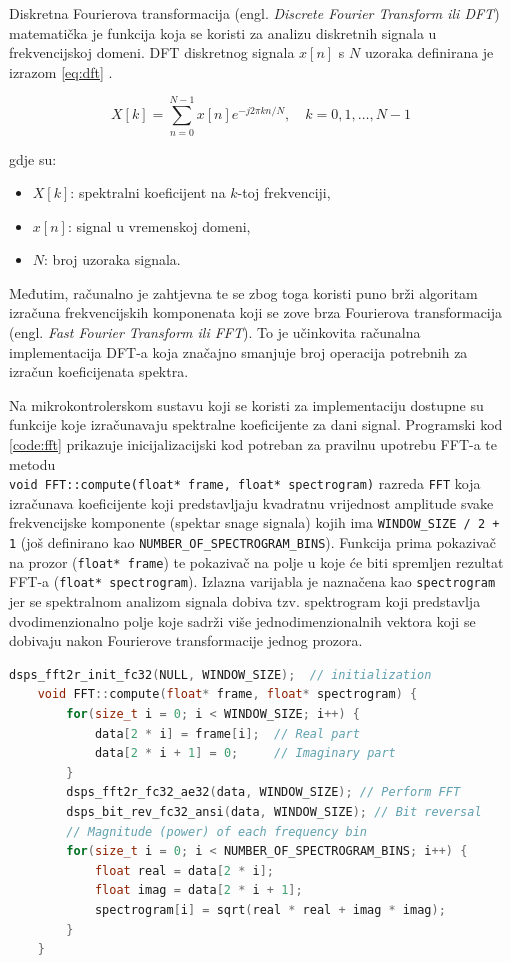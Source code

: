 Diskretna Fourierova transformacija (engl. \textit{Discrete Fourier Transform ili DFT}) matematička je
funkcija koja se koristi za analizu diskretnih signala u frekvencijskoj domeni. 
DFT diskretnog signala \( x[n] \) s \( N \) uzoraka definirana je izrazom \eqref{eq:dft} .

\begin{equation}
    X[k] = \sum_{n=0}^{N-1} x[n] e^{-j 2 \pi k n / N}, \quad k = 0, 1, \dots, N-1
    \label{eq:dft}
\end{equation}

gdje su:
\begin{itemize}
    \item \( X[k] \): spektralni koeficijent na \( k \)-toj frekvenciji,
    \item \( x[n] \): signal u vremenskoj domeni,
    \item \( N \): broj uzoraka signala.
\end{itemize}

Međutim, računalno je zahtjevna te se zbog toga koristi puno brži algoritam izračuna
frekvencijskih komponenata koji se zove brza Fourierova transformacija (engl. \textit{Fast Fourier
Transform ili FFT}). To je učinkovita računalna implementacija DFT-a koja značajno smanjuje
broj operacija potrebnih za izračun koeficijenata spektra.

Na mikrokontrolerskom sustavu koji se koristi za implementaciju dostupne su funkcije koje
izračunavaju spektralne koeficijente za dani signal. 
Programski kod \ref{code:fft} prikazuje inicijalizacijski kod potreban za pravilnu 
upotrebu FFT-a te metodu \\ \texttt{void FFT::compute(float* frame, float* spectrogram)} 
razreda \texttt{FFT} koja izračunava koeficijente koji predstavljaju kvadratnu vrijednost
amplitude svake frekvencijske komponente (spektar snage signala) kojih ima 
\texttt{WINDOW\_SIZE / 2 + 1} (još definirano kao \texttt{NUMBER\_OF\_SPECTROGRAM\_BINS}). 
Funkcija prima pokazivač na prozor (\texttt{float* frame}) te pokazivač na polje
u koje će biti spremljen rezultat FFT-a (\texttt{float* spectrogram}). Izlazna
varijabla je naznačena kao \texttt{spectrogram} jer se spektralnom analizom signala dobiva tzv.
spektrogram koji predstavlja dvodimenzionalno
polje koje sadrži više jednodimenzionalnih vektora koji se dobivaju nakon
Fourierove transformacije jednog prozora. 

\begin{lstlisting}[language=C++, caption=FFT, label=code:fft]
    dsps_fft2r_init_fc32(NULL, WINDOW_SIZE);  // initialization 
    void FFT::compute(float* frame, float* spectrogram) {
        for(size_t i = 0; i < WINDOW_SIZE; i++) {
            data[2 * i] = frame[i];  // Real part
            data[2 * i + 1] = 0;     // Imaginary part
        }
        dsps_fft2r_fc32_ae32(data, WINDOW_SIZE); // Perform FFT
        dsps_bit_rev_fc32_ansi(data, WINDOW_SIZE); // Bit reversal
        // Magnitude (power) of each frequency bin
        for(size_t i = 0; i < NUMBER_OF_SPECTROGRAM_BINS; i++) {
            float real = data[2 * i];
            float imag = data[2 * i + 1];
            spectrogram[i] = sqrt(real * real + imag * imag);
        }
    }
\end{lstlisting}


